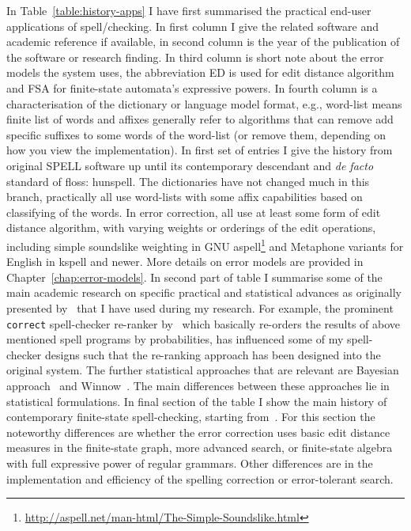 \documentclass[officiallayout,final]{unihelcompling}
\begin{document}
In Table~\ref{table:history-apps} I have first summarised the practical
end-user applications of spell\-/checking. In first column I give the
related software and academic reference if available, in second column is the
year of the publication of the software or research finding. In third column
is short note about the error models the system uses, the abbreviation ED is
used for edit distance algorithm and FSA for finite-state automata's 
expressive powers. In fourth column is a characterisation of the dictionary
or language model format, e.g., word-list means finite list of words and 
affixes generally refer to algorithms that can remove add specific suffixes to
some words of the word-list (or remove them, depending on how you view the
implementation).
In first set of entries I give the history from original SPELL software up
until its contemporary descendant and \emph{de facto} standard of
\gls{floss}: hunspell. The dictionaries have
not changed much in this branch, practically all use word-lists with some
affix capabilities based on classifying of the words. In error correction,
all use at least some form of edit distance algorithm, with varying weights
or orderings of the edit operations, including simple soundslike weighting
in GNU aspell\footnote{\url{http://aspell.net/man-html/The-Simple-Soundslike.html}} and Metaphone variants for English in kspell and newer. More details on
error models are provided in  Chapter~\ref{chap:error-models}.
In second part of table I summarise some of the main academic research
on specific practical and statistical advances as originally presented
by~\citet{al2006learning} that I have used during my research. For example, the
prominent \texttt{correct} spell-checker re-ranker by~\citet{church1991probability} which basically re-orders the results of above mentioned spell programs by
probabilities, has influenced some of my spell-checker designs such that
the re-ranking approach has been designed into the original system.
The further statistical approaches that are relevant are Bayesian 
approach~\citep{golding1995bayesian} and Winnow~\citep{golding1999winnow}. The
main differences between these approaches lie in statistical formulations.
In final section of the table I show the main history of contemporary 
finite-state spell-checking, starting from~\citet{oflazer1996errortolerant}.
For this section the noteworthy differences are whether the error correction
uses basic edit distance measures in the finite-state graph, more advanced
search, or finite-state algebra with full expressive power of regular grammars.
Other differences are in the implementation and efficiency of the
spelling correction or error-tolerant search.
\end{document}
